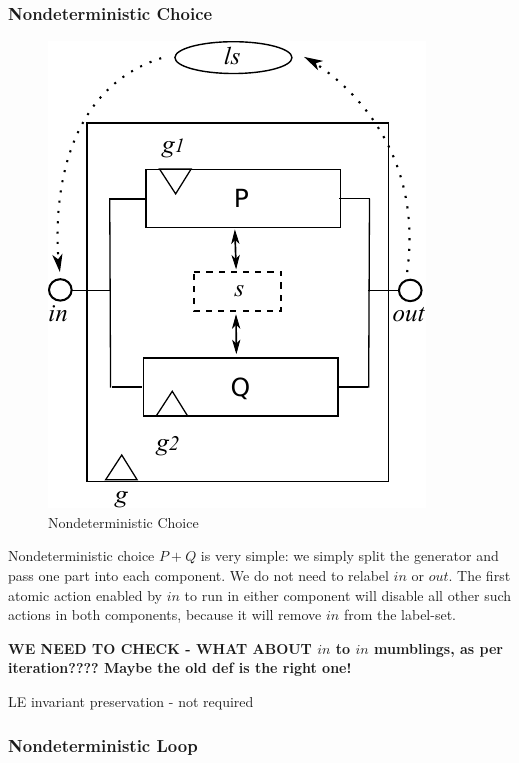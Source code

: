 \newpage
\subsubsection{Nondeterministic Choice}

\begin{figure}
  \centering
  \includegraphics{images/nondet-actual}
  \caption{Nondeterministic Choice}
  \label{fig:nondet-choice}
\end{figure}

Nondeterministic choice $P+Q$ is very simple:
we simply split the generator and pass one part
into each component. We do not need to relabel $in$
or $out$.
The first atomic action enabled by $in$ to
run in either component will disable all other such actions in both components,
because it will remove $in$ from the label-set.

\textbf{WE NEED TO CHECK - WHAT ABOUT $in$ to $in$ mumblings, as per iteration???? Maybe the old def is the right one!}




LE invariant preservation - not required



\subsubsection{Nondeterministic Loop}

